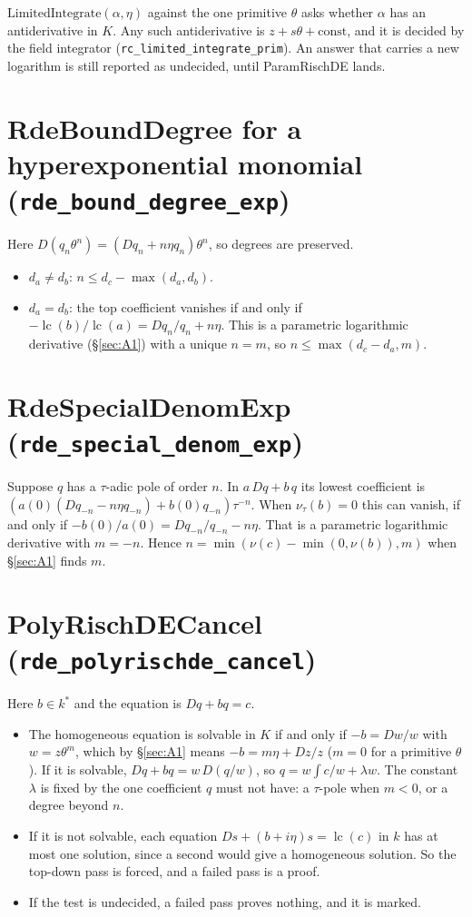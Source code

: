 \documentclass[11pt]{article}
\theoremstyle{definition}
\theoremstyle{remark}
\newcommand{\lc}{\operatorname{lc}}
\newcommand{\code}[1]{\texttt{#1}}
\begin{document}
$\mathrm{LimitedIntegrate}(\alpha,\eta)$ against the one primitive $\theta$
asks whether $\alpha$ has an antiderivative in $K$. Any such antiderivative is
$z+s\theta+\text{const}$, and it is decided by the field integrator
(\code{rc\_limited\_integrate\_prim}). An answer that carries a new logarithm
is still reported as undecided, until ParamRischDE lands.

\section{RdeBoundDegree for a hyperexponential monomial (\code{rde\_bound\_degree\_exp})}

Here $D(q_n\theta^n)=(Dq_n+n\eta q_n)\theta^n$, so degrees are preserved.
\begin{itemize}
\item $d_a\ne d_b$: $n\le d_c-\max(d_a,d_b)$.
\item $d_a=d_b$: the top coefficient vanishes if and only if
  $-\lc(b)/\lc(a)=Dq_n/q_n+n\eta$. This is a parametric logarithmic derivative
  (\S\ref{sec:A1}) with a unique $n=m$, so $n\le\max(d_c-d_a,m)$.
\end{itemize}

\section{RdeSpecialDenomExp (\code{rde\_special\_denom\_exp})}

Suppose $q$ has a $\tau$-adic pole of order $n$. In $a\,Dq+b\,q$ its lowest
coefficient is $(a(0)(Dq_{-n}-n\eta q_{-n})+b(0)q_{-n})\tau^{-n}$. When
$\nu_\tau(b)=0$ this can vanish, if and only if $-b(0)/a(0)=Dq_{-n}/q_{-n}-n\eta$.
That is a parametric logarithmic derivative with $m=-n$. Hence
$n=\min(\nu(c)-\min(0,\nu(b)),m)$ when \S\ref{sec:A1} finds $m$.

\section{PolyRischDECancel (\code{rde\_polyrischde\_cancel})}

Here $b\in k^*$ and the equation is $Dq+bq=c$.
\begin{itemize}
\item The homogeneous equation is solvable in $K$ if and only if $-b=Dw/w$ with
  $w=z\theta^m$, which by \S\ref{sec:A1} means $-b=m\eta+Dz/z$ ($m=0$ for a
  primitive $\theta$). If it is solvable, $Dq+bq=w\,D(q/w)$, so
  $q=w\int c/w+\lambda w$. The constant $\lambda$ is fixed by the one
  coefficient $q$ must not have: a $\tau$-pole when $m<0$, or a degree beyond
  $n$.
\item If it is not solvable, each equation $Ds+(b+i\eta)s=\lc(c)$ in $k$ has at
  most one solution, since a second would give a homogeneous solution. So the
  top-down pass is forced, and a failed pass is a proof.
\item If the test is undecided, a failed pass proves nothing, and it is marked.
\end{itemize}
\end{document}
